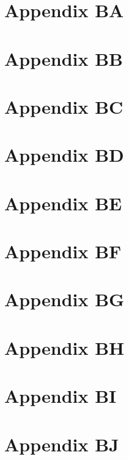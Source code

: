 \chapter{Appendix BA}

\chapter{Appendix BB}

\chapter{Appendix BC}

\chapter{Appendix BD}

\chapter{Appendix BE}

\chapter{Appendix BF}

\chapter{Appendix BG}

\chapter{Appendix BH}

\chapter{Appendix BI}

\chapter{Appendix BJ}

